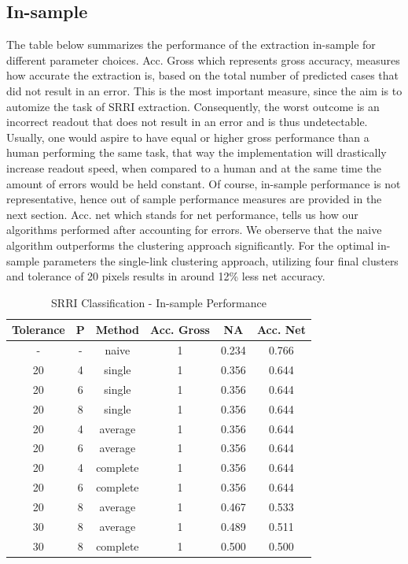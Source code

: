 \documentclass[aodsor,preprint]{imsart}
\numberwithin{equation}{section}
\theoremstyle{plain}
\begin{document}
\subsection{In-sample}
The table below summarizes the performance of the extraction in-sample for different parameter choices. Acc. Gross which represents gross accuracy, measures how accurate the extraction is, based on the total number of predicted cases that did not result in an error. This is the most important measure, since the aim is to automize the task of SRRI extraction. Consequently, the worst outcome is an incorrect readout that does not result in an error and is thus undetectable. Usually, one would aspire to have equal or higher gross performance than a human performing the same task, that way the implementation will drastically increase readout speed, when compared to a human and at the same time the amount of errors would be held constant. Of course, in-sample performance is not representative, hence out of sample performance measures are provided in the next section. Acc. net which stands for net performance, tells us how our algorithms performed after accounting for errors. We oberserve that the naive algorithm outperforms the clustering approach significantly. For the optimal in-sample parameters the single-link clustering approach, utilizing four final clusters and tolerance of 20 pixels results in around 12\% less net accuracy.

\begin{table}[H]
	\begin{center}
		\caption{SRRI Classification - In-sample Performance}
		\begin{tabular}{|c|c|c|c|c|c|}
			\hline
			Tolerance & P & Method & Acc. Gross & NA & Acc. Net\\
			\hline
			- & - & naive & 1 & 0.234 & 0.766\\
			\hline
			 20 & 4 & single & 1 & 0.356 & 0.644\\
			\hline
			 20 & 6 & single & 1 & 0.356 & 0.644 \\
			\hline
			 20 & 8 & single & 1 & 0.356 & 0.644 \\
			\hline
			 20 & 4 & average & 1 & 0.356 & 0.644\\
			\hline
			 20 & 6 & average & 1 & 0.356 & 0.644\\
			\hline
			 20 & 4 & complete & 1 & 0.356 & 0.644\\
			\hline
			 20 & 6 & complete & 1 & 0.356 & 0.644\\
			\hline
			 20 & 8 & average & 1 & 0.467 & 0.533\\
			\hline
			 30 & 8 & average & 1 & 0.489 & 0.511\\
			\hline
			 30 & 8 & complete & 1 & 0.500 & 0.500\\
			\hline
		\end{tabular}
	\end{center}
\end{table}
\end{document}
